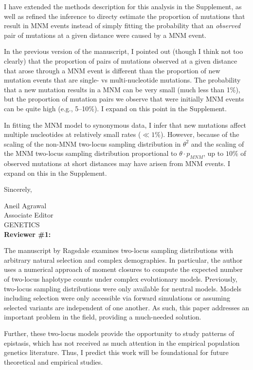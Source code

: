 \documentclass{article}
\newenvironment{response}%
  {\list{}{\leftmargin=0.5in\rightmargin=0.5in\color{blue}}\item[]}%
  {\endlist}
\begin{document}
\begin{response}
    I have extended the methods description for this analysis in the Supplement, as
    well as refined the inference to directy estimate the proportion of mutations
    that result in MNM events instead of simply fitting the probability that an
    \emph{observed} pair of mutations at a given distance were caused by a MNM event.
    
    In the previous version of the manuscript, I pointed out (though I think not too
    clearly) that the proportion of pairs of mutations observed at a given distance
    that arose through a MNM event is different than the proportion of new mutation events
    that are single- vs multi-nucleotide mutations. The probability that a new
    mutation results in a MNM can be very small (much less than 1\%), but the proportion
    of mutation pairs we observe that were initially MNM events can be quite high
    (e.g., 5--10\%). I expand on this point in the Supplement.

    In fitting the MNM model to synonymous data, I infer that new mutations affect
    multiple nucleotides at relatively small rates ($\ll 1\%$). However, because of
    the scaling of the non-MNM two-locus sampling distribution in $\theta^2$ and
    the scaling of the MNM two-locus sampling distribution proportional to
    $\theta \cdot p_{MNM}$, up to $10\%$ of observed mutations at short distances may
    have arisen from MNM events. I expand on this in the Supplement.
\end{response}

Sincerely,

Aneil Agrawal\\
Associate Editor\\
GENETICS\\

\textbf{Reviewer \#1:}

The manuscript by Ragsdale examines two-locus sampling distributions with
arbitrary natural selection and complex demographies. In particular, the author
uses a numerical approach of moment closures to compute the expected number of
two-locus haplotype counts under complex evolutionary models. Previously,
two-locus sampling distributions were only available for neutral models. Models
including selection were only accessible via forward simulations or assuming
selected variants are independent of one another. As such, this paper addresses
an important problem in the field, providing a much-needed solution.

Further, these two-locus models provide the opportunity to study patterns of
epistasis, which has not received as much attention in the empirical population
genetics literature. Thus, I predict this work will be foundational for future
theoretical and empirical studies.
\end{document}
